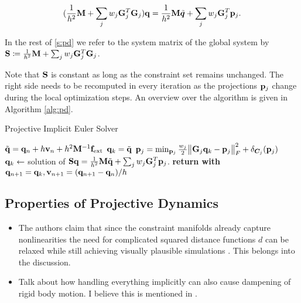 \begin{equation}\label{eq:pd-global-system}
    (\frac{1}{h^2}\mathbf{M} + \sum_j w_j \mathbf{G}_j^T \mathbf{G}_j)\mathbf{q} = \frac{1}{h^2}\mathbf{M}\tilde{\bm{q}} + \sum_j w_j \mathbf{G}_j^T \mathbf{p}_j.
\end{equation}

\noindent In the rest of \cref{s:pd} we refer to the system matrix of the global system by 
$\mathbf{S} \coloneqq \frac{1}{h^2}\mathbf{M} + \sum_j w_j \mathbf{G}_j^T \mathbf{G}_j$.

Note that $\mathbf{S}$ is constant as long as the constraint set remains unchanged. The right side needs to be recomputed in every 
iteration as the projections $\mathbf{p}_j$ change during the local optimization steps.  An overview over the algorithm is given in 
Algorithm \ref{alg:pd}.

\begin{algorithm}
\caption{Projective Implicit Euler Solver}\label{alg:pd}
\begin{algorithmic}
\State $\tilde{\mathbf{q}} = \mathbf{q}_n + h\mathbf{v}_n + h^2\mathbf{M}^{-1}\mathbf{f}_{\text{ext}}$
\State $\mathbf{q}_k = \tilde{\mathbf{q}}$
\State $\mathbf{p}_j = \min_{\mathbf{p}_j} \frac{w_j}{2}\norm{\mathbf{G}_j\mathbf{q}_k - \mathbf{p}_j}^2_F + \delta_{\bm{C}_j}(\mathbf{p}_j)$
\EndFor
\State $\mathbf{q}_{k} \gets$ solution of $\mathbf{S}\mathbf{q} = \frac{1}{h^2}\mathbf{M}\tilde{\mathbf{q}} + \sum_j w_j \mathbf{G}_j^T \mathbf{p}_j$.
\EndFor
\State \textbf{return with } $\mathbf{q}_{n+1} = \mathbf{q}_k, \mathbf{v}_{n+1} = (\mathbf{q}_{n+1} - \mathbf{q}_n) / h$
\EndProcedure
\end{algorithmic}
\end{algorithm}

\subsection{Properties of Projective Dynamics}\label{ss:pd-properties}
\begin{itemize}
    \item The authors claim that since the constraint manifolds already capture nonlinearities the need for complicated squared distance functions $d$
        can be relaxed while still achieving visually plausible simulations \cite{bouaziz2014}. This belongs into the discussion.
    \item Talk about how handling everything implicitly can also cause dampening of rigid body motion. I believe this is mentioned in \cite{servin2006}.
\end{itemize}   

